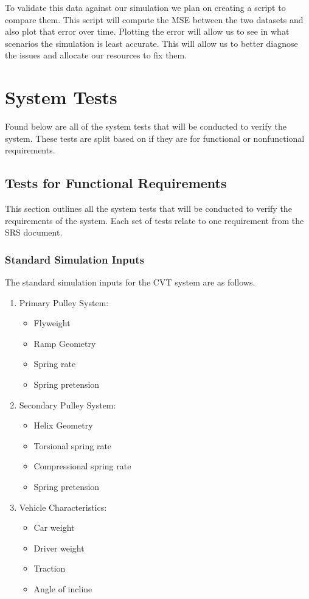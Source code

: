 \documentclass[12pt, titlepage]{article}
\begin{document}
\noindent To validate this data against our simulation we plan on creating a script to compare them.
This script will compute the MSE between the two datasets and also plot that error over time.
Plotting the error will allow us to see in what scenarios the simulation is least accurate.
This will allow us to better diagnose the issues and allocate our resources to fix them.

\section{System Tests}

Found below are all of the system tests that will be conducted to verify the system.
These tests are split based on if they are for functional or nonfunctional requirements.

\subsection{Tests for Functional Requirements}

This section outlines all the system tests that will be conducted to verify the requirements of the system.
Each set of tests relate to one requirement from the SRS document.

\subsubsection*{Standard Simulation Inputs}
\label{sec:standard_inputs}
The standard simulation inputs for the CVT system are as follows.
\begin{enumerate}
  \item Primary Pulley System:
  \begin{itemize}
    \item Flyweight
    \item Ramp Geometry
    \item Spring rate
    \item Spring pretension
  \end{itemize}
  \item Secondary Pulley System:
  \begin{itemize}
    \item Helix Geometry
    \item Torsional spring rate
    \item Compressional spring rate
    \item Spring pretension
  \end{itemize}
  \item Vehicle Characteristics:
  \begin{itemize}
    \item Car weight
    \item Driver weight
    \item Traction
    \item Angle of incline
  \end{itemize}
\end{enumerate}
\end{document}
